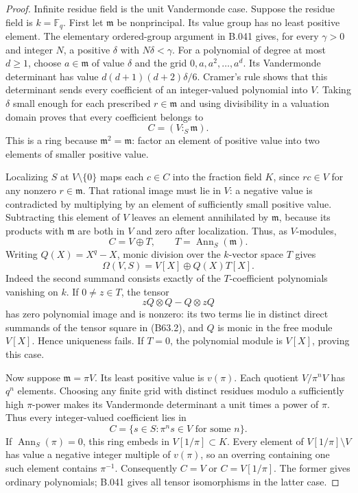 \begin{proof}
Infinite residue field is the unit Vandermonde
case. Suppose the residue field is $k=\mathbb F_q$.
First let $\mathfrak m$ be nonprincipal. Its value
group has no least positive element. The elementary
ordered-group argument in B.041 gives, for every
$\gamma>0$ and integer $N$, a positive $\delta$
with $N\delta<\gamma$.
For a polynomial of degree at most $d\ge1$, choose
$a\in\mathfrak m$ of value $\delta$ and the grid
$0,a,a^2,\ldots,a^d$. Its Vandermonde determinant
has value $d(d+1)(d+2)\delta/6$. Cramer's rule
shows that this determinant sends every coefficient
of an integer-valued polynomial into $V$.
Taking $\delta$ small enough for each prescribed
$r\in\mathfrak m$ and using divisibility in a
valuation domain proves that every coefficient
belongs to
\[
                         C=(V:_S\mathfrak m).
\]
This is a ring because $\mathfrak m^2=\mathfrak m$:
factor an element of positive value into two
elements of smaller positive value.

Localizing $S$ at $V\setminus\{0\}$ maps each
$c\in C$ into the fraction field $K$, since
$rc\in V$ for any nonzero $r\in\mathfrak m$.
That rational image must lie in $V$: a negative
value is contradicted by multiplying by an element
of sufficiently small positive value. Subtracting
this element of $V$ leaves an element annihilated
by $\mathfrak m$, because its products with
$\mathfrak m$ are both in $V$ and zero after
localization. Thus, as $V$-modules,
\[
                    C=V\oplus T,\qquad
                    T=\operatorname{Ann}_S(\mathfrak m).
\]
Writing $Q(X)=X^q-X$, monic division over the
$k$-vector space $T$ gives
\[
                    \Omega(V,S)=V[X]\oplus Q(X)T[X].     \tag{B63.2}
\]
Indeed the second summand consists exactly of
the $T$-coefficient polynomials vanishing on $k$.
If $0\ne z\in T$, the tensor
\[
                  zQ\otimes Q-Q\otimes zQ
\]
has zero polynomial image and is nonzero: its
two terms lie in distinct direct summands of
the tensor square in (B63.2), and $Q$ is monic
in the free module $V[X]$. Hence uniqueness
fails. If $T=0$, the polynomial module is
$V[X]$, proving this case.

Now suppose $\mathfrak m=\pi V$. Its least positive
value is $v(\pi)$. Each quotient $V/\pi^nV$ has
$q^n$ elements. Choosing any finite grid with
distinct residues modulo a sufficiently high
$\pi$-power makes its Vandermonde determinant
a unit times a power of $\pi$. Thus every
integer-valued coefficient lies in
\[
             C=\{s\in S:\pi^ns\in V\text{ for some }n\}.
                                                               \tag{B63.3}
\]
If $\operatorname{Ann}_S(\pi)=0$, this ring embeds
in $V[1/\pi]\subset K$. Every element of
$V[1/\pi]\setminus V$ has value a negative
integer multiple of $v(\pi)$, so an overring
containing one such element contains $\pi^{-1}$.
Consequently $C=V$ or $C=V[1/\pi]$. The former
gives ordinary polynomials; B.041 gives all
tensor isomorphisms in the latter case.


\end{proof}
